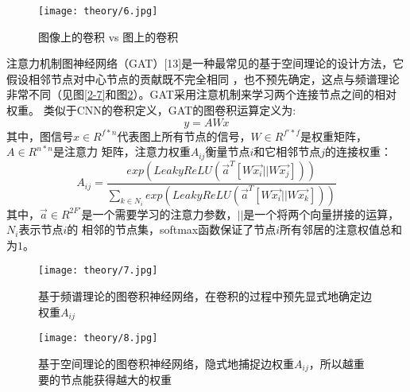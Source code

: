 \begin{figure}[ht]
    \centering
    \texttt{[image: theory/6.jpg]}
    \caption{\label{2-6}图像上的卷积 vs 图上的卷积}
\end{figure}

注意力机制图神经网络（GAT）[13]是一种最常见的基于空间理论的设计方法，它假设相邻节点对中心节点的贡献既不完全相同
，也不预先确定，这点与频谱理论非常不同（见图\ref{2-7}和图\ref{2-8}）。GAT采用注意机制来学习两个连接节点之间的相对权重。
类似于CNN的卷积定义，GAT的图卷积运算定义为:
$$  y = A W x $$
其中，图信号$ x\in R^{f*n} $代表图上所有节点的信号，$ W \in R^{f'*f} $是权重矩阵，$A \in R^{n*n}$是注意力
矩阵，注意力权重$A_{ij}$衡量节点$i$和它相邻节点$j$的连接权重：
$$
    A_{ij} = \frac{exp(LeakyReLU(\vec{a}^{T}[W\vec{x_{i}}||W\vec{x_{j}}]))}
    { {\textstyle \sum_{k\in N_{i} }^{}} exp(LeakyReLU(\vec{a}^{T}[W\vec{x_{i}}||W\vec{x_{k}}]))}  
$$
其中，$\vec{a} \in R^{2F'}$是一个需要学习的注意力参数，$ || $是一个将两个向量拼接的运算，$ N_{i} $表示节点$i$的
相邻的节点集，softmax函数保证了节点$i$所有邻居的注意权值总和为$1$。

\begin{figure}[htbp]
    \centering
    \begin{minipage}[t]{0.48\textwidth}
    \centering
    \captionsetup{width=5cm}
    \texttt{[image: theory/7.jpg]}
    \caption{\label{2-7}基于频谱理论的图卷积神经网络，在卷积的过程中预先显式地确定边权重$A_{ij}$}
    \end{minipage}
    \begin{minipage}[t]{0.48\textwidth}
    \centering
    \captionsetup{width=5cm}
    \texttt{[image: theory/8.jpg]}
    \caption{\label{2-8}基于空间理论的图卷积神经网络，隐式地捕捉边权重$A_{ij}$，所以越重要的节点能获得越大的权重}
    \end{minipage}
\end{figure}

